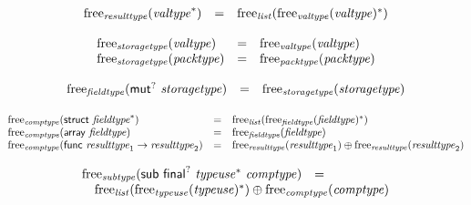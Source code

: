 $$
\begin{array}[t]{@{}lcl@{}l@{}}
{\mathrm{free}}_{\mathit{resulttype}}({{\mathit{valtype}}^\ast}) & = & {\mathrm{free}}_{\mathit{list}}({{\mathrm{free}}_{\mathit{valtype}}({\mathit{valtype}})^\ast}) \\
\end{array}
$$

$$
\begin{array}[t]{@{}lcl@{}l@{}}
{\mathrm{free}}_{\mathit{storagetype}}({\mathit{valtype}}) & = & {\mathrm{free}}_{\mathit{valtype}}({\mathit{valtype}}) \\
{\mathrm{free}}_{\mathit{storagetype}}({\mathit{packtype}}) & = & {\mathrm{free}}_{\mathit{packtype}}({\mathit{packtype}}) \\
\end{array}
$$

$$
\begin{array}[t]{@{}lcl@{}l@{}}
{\mathrm{free}}_{\mathit{fieldtype}}({\mathsf{mut}^?}~{\mathit{storagetype}}) & = & {\mathrm{free}}_{\mathit{storagetype}}({\mathit{storagetype}}) \\
\end{array}
$$

$$
\begin{array}[t]{@{}lcl@{}l@{}}
{\mathrm{free}}_{\mathit{comptype}}(\mathsf{struct}~{{\mathit{fieldtype}}^\ast}) & = & {\mathrm{free}}_{\mathit{list}}({{\mathrm{free}}_{\mathit{fieldtype}}({\mathit{fieldtype}})^\ast}) \\
{\mathrm{free}}_{\mathit{comptype}}(\mathsf{array}~{\mathit{fieldtype}}) & = & {\mathrm{free}}_{\mathit{fieldtype}}({\mathit{fieldtype}}) \\
{\mathrm{free}}_{\mathit{comptype}}(\mathsf{func}~{\mathit{resulttype}}_1 \rightarrow {\mathit{resulttype}}_2) & = & {\mathrm{free}}_{\mathit{resulttype}}({\mathit{resulttype}}_1) \oplus {\mathrm{free}}_{\mathit{resulttype}}({\mathit{resulttype}}_2) \\
\end{array}
$$

$$
\begin{array}[t]{@{}lcl@{}l@{}}
{\mathrm{free}}_{\mathit{subtype}}(\mathsf{sub}~{\mathsf{final}^?}~{{\mathit{typeuse}}^\ast}~{\mathit{comptype}}) & = & & \\
 \multicolumn{4}{@{}l@{}}{\quad
\begin{array}[t]{@{}l@{}}
{\mathrm{free}}_{\mathit{list}}({{\mathrm{free}}_{\mathit{typeuse}}({\mathit{typeuse}})^\ast}) \oplus {\mathrm{free}}_{\mathit{comptype}}({\mathit{comptype}}) \\
\end{array}
} \\
\end{array}
$$

